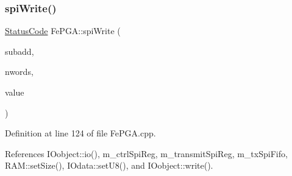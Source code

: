 \subsubsection{\texorpdfstring{spi\+Write()}{spiWrite()}\hspace{0.1cm}{\footnotesize\ttfamily [2/3]}}
{\footnotesize\ttfamily \hyperlink{classStatusCode}{Status\+Code} Fe\+P\+G\+A\+::spi\+Write (\begin{DoxyParamCaption}\item[{unsigned int}]{subadd,  }\item[{unsigned int}]{nwords,  }\item[{Py\+Object $\ast$}]{value }\end{DoxyParamCaption})}



Definition at line 124 of file Fe\+P\+G\+A.\+cpp.



References I\+Oobject\+::io(), m\+\_\+ctrl\+Spi\+Reg, m\+\_\+transmit\+Spi\+Reg, m\+\_\+tx\+Spi\+Fifo, R\+A\+M\+::set\+Size(), I\+Odata\+::set\+U8(), and I\+Oobject\+::write().


